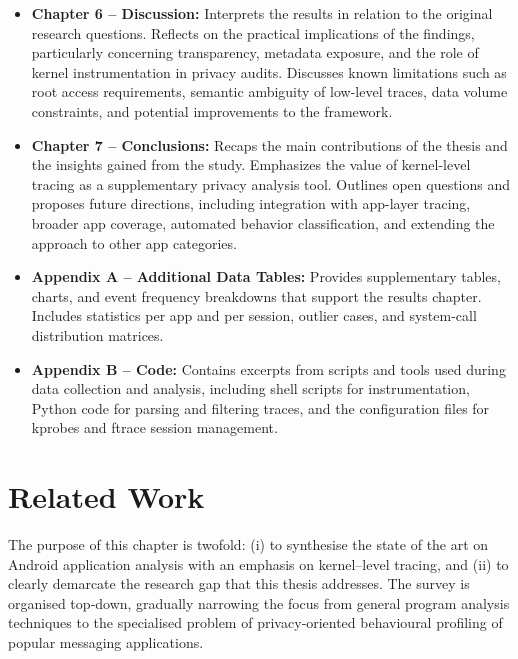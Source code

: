 \documentclass[a4paper,12pt]{report}
\begin{document}
\begin{itemize}
    \item \textbf{Chapter 6 – Discussion:} Interprets the results in relation to the original research questions. Reflects on the practical implications of the findings, particularly concerning transparency, metadata exposure, and the role of kernel instrumentation in privacy audits. Discusses known limitations such as root access requirements, semantic ambiguity of low-level traces, data volume constraints, and potential improvements to the framework.

    \item \textbf{Chapter 7 – Conclusions:} Recaps the main contributions of the thesis and the insights gained from the study. Emphasizes the value of kernel-level tracing as a supplementary privacy analysis tool. Outlines open questions and proposes future directions, including integration with app-layer tracing, broader app coverage, automated behavior classification, and extending the approach to other app categories.

    \item \textbf{Appendix A – Additional Data Tables:} Provides supplementary tables, charts, and event frequency breakdowns that support the results chapter. Includes statistics per app and per session, outlier cases, and system-call distribution matrices.

    \item \textbf{Appendix B – Code:} Contains excerpts from scripts and tools used during data collection and analysis, including shell scripts for instrumentation, Python code for parsing and filtering traces, and the configuration files for kprobes and ftrace session management.
\end{itemize}

\chapter{Related Work}\label{ch:related}

The purpose of this chapter is twofold: (i) to synthesise the state of the art on Android
application analysis with an emphasis on kernel–level tracing, and (ii) to
clearly demarcate the research gap that this thesis addresses.  The survey is
organised top‑down, gradually narrowing the focus from general program analysis
techniques to the specialised problem of privacy‑oriented behavioural
profiling of popular messaging applications.
\end{document}
